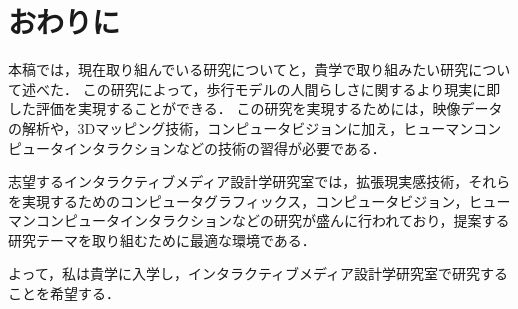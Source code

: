 \documentclass[twocolumn]{jarticle}%
\begin{document}
\section{おわりに}
本稿では，現在取り組んでいる研究についてと，貴学で取り組みたい研究について述べた．
この研究によって，歩行モデルの人間らしさに関するより現実に即した評価を実現することができる．
この研究を実現するためには，映像データの解析や，3Dマッピング技術，コンピュータビジョンに加え，ヒューマンコンピュータインタラクションなどの技術の習得が必要である．

志望するインタラクティブメディア設計学研究室では，拡張現実感技術，それらを実現するためのコンピュータグラフィックス，コンピュータビジョン，ヒューマンコンピュータインタラクションなどの研究が盛んに行われており，提案する研究テーマを取り組むために最適な環境である．

よって，私は貴学に入学し，インタラクティブメディア設計学研究室で研究することを希望する．





\end{document}
